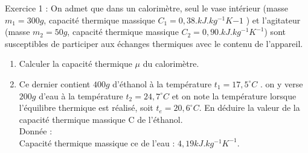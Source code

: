 \documentclass[12pt, french]{article}
\begin{document}
\begin{center}
\end{center}


   \begin{Box2}{Exercice 1 : }
  On admet que dans un calorimètre, seul le vase intérieur (masse $m_1 = 300g$, capacité thermique massique $C_1=0,38.kJ.kg^{-1}K{-1}$ ) et l’agitateur (masse $m_2 = 50 g$, capacité thermique massique $C_2=0,90.kJ.kg^{-1}K^{-1}$) sont
susceptibles de participer aux échanges thermiques avec le contenu de l’appareil.
     \begin{enumerate}

         \item Calculer la capacité thermique $\mu$ du calorimètre.

         \item Ce dernier contient $400 g$ d’éthanol à la température $t_1 = 17,5 ^{\circ} C$ . on y verse $200 g$ d’eau à la
           température $t_2 = 24,7^{\circ}C$ et on note la température lorsque l’équilibre thermique est réalisé, soit $t_e=20,6^{\circ}C$.
En déduire la valeur de la capacité thermique massique C de l’éthanol.
\\Donnée : \\Capacité thermique massique ce de l’eau : $4,19 kJ.kg^{-1}K^{-1}$.
     \end{enumerate}
   \end{Box2}
\end{document}

